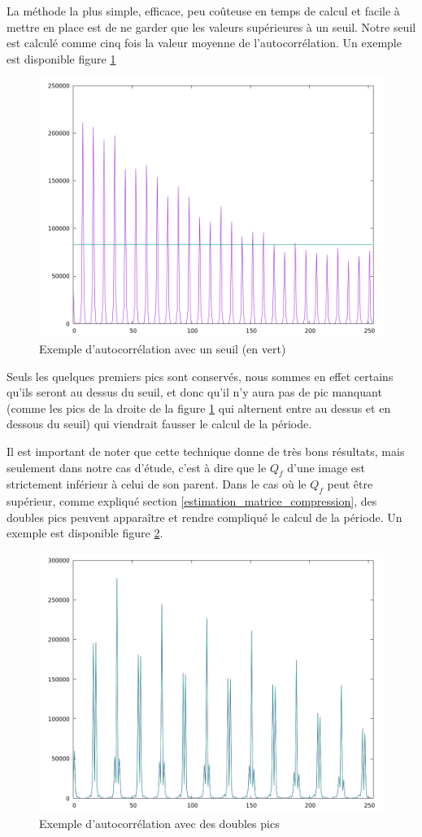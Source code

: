 \documentclass[utf8,final]{stageM2R} %
\begin{document}
La méthode la plus simple, efficace,  peu coûteuse en temps de calcul et facile à mettre en place est de ne garder que les valeurs supérieures à un seuil. Notre seuil est calculé comme cinq fois la valeur moyenne de l'autocorrélation. Un exemple est disponible figure \ref{fig:signal_filtered}

\begin{figure}[H]
    \centering
    \includegraphics[width=0.5\linewidth]{images/autocorrelation_filtered}
    \caption{Exemple d'autocorrélation avec un seuil (en vert)}
    \label{fig:signal_filtered}
\end{figure}

Seuls les quelques premiers pics sont conservés, nous sommes en effet certains qu'ils seront au dessus du seuil, et donc qu'il n'y aura pas de pic manquant (comme les pics de la droite de la figure \ref{fig:signal_filtered} qui alternent entre au dessus et en dessous du seuil) qui viendrait fausser le calcul de la période.

Il est important de noter que cette technique donne de très bons résultats, mais seulement dans notre cas d'étude, c'est à dire que le $Q_f$ d'une image est strictement inférieur à celui de son parent. Dans le cas où le $Q_f$ peut être supérieur, comme expliqué section \ref{estimation_matrice_compression}, des doubles pics peuvent apparaître et rendre compliqué le calcul de la période. Un exemple est disponible figure \ref{fig:double_peaks}.

\begin{figure}[H]
    \centering
    \includegraphics[width=0.5\linewidth]{images/autocorrelation_double}
    \caption{Exemple d'autocorrélation avec des doubles pics}
    \label{fig:double_peaks}
\end{figure}
\end{document}
